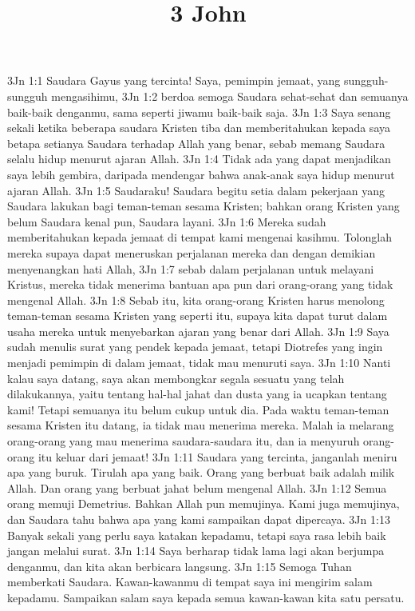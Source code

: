 

\title{3 John}

3Jn 1:1  Saudara Gayus yang tercinta! Saya, pemimpin jemaat, yang sungguh-sungguh mengasihimu,
3Jn 1:2  berdoa semoga Saudara sehat-sehat dan semuanya baik-baik denganmu, sama seperti jiwamu baik-baik saja.
3Jn 1:3  Saya senang sekali ketika beberapa saudara Kristen tiba dan memberitahukan kepada saya betapa setianya Saudara terhadap Allah yang benar, sebab memang Saudara selalu hidup menurut ajaran Allah.
3Jn 1:4  Tidak ada yang dapat menjadikan saya lebih gembira, daripada mendengar bahwa anak-anak saya hidup menurut ajaran Allah.
3Jn 1:5  Saudaraku! Saudara begitu setia dalam pekerjaan yang Saudara lakukan bagi teman-teman sesama Kristen; bahkan orang Kristen yang belum Saudara kenal pun, Saudara layani.
3Jn 1:6  Mereka sudah memberitahukan kepada jemaat di tempat kami mengenai kasihmu. Tolonglah mereka supaya dapat meneruskan perjalanan mereka dan dengan demikian menyenangkan hati Allah,
3Jn 1:7  sebab dalam perjalanan untuk melayani Kristus, mereka tidak menerima bantuan apa pun dari orang-orang yang tidak mengenal Allah.
3Jn 1:8  Sebab itu, kita orang-orang Kristen harus menolong teman-teman sesama Kristen yang seperti itu, supaya kita dapat turut dalam usaha mereka untuk menyebarkan ajaran yang benar dari Allah.
3Jn 1:9  Saya sudah menulis surat yang pendek kepada jemaat, tetapi Diotrefes yang ingin menjadi pemimpin di dalam jemaat, tidak mau menuruti saya.
3Jn 1:10  Nanti kalau saya datang, saya akan membongkar segala sesuatu yang telah dilakukannya, yaitu tentang hal-hal jahat dan dusta yang ia ucapkan tentang kami! Tetapi semuanya itu belum cukup untuk dia. Pada waktu teman-teman sesama Kristen itu datang, ia tidak mau menerima mereka. Malah ia melarang orang-orang yang mau menerima saudara-saudara itu, dan ia menyuruh orang-orang itu keluar dari jemaat!
3Jn 1:11  Saudara yang tercinta, janganlah meniru apa yang buruk. Tirulah apa yang baik. Orang yang berbuat baik adalah milik Allah. Dan orang yang berbuat jahat belum mengenal Allah.
3Jn 1:12  Semua orang memuji Demetrius. Bahkan Allah pun memujinya. Kami juga memujinya, dan Saudara tahu bahwa apa yang kami sampaikan dapat dipercaya.
3Jn 1:13  Banyak sekali yang perlu saya katakan kepadamu, tetapi saya rasa lebih baik jangan melalui surat.
3Jn 1:14  Saya berharap tidak lama lagi akan berjumpa denganmu, dan kita akan berbicara langsung.
3Jn 1:15  Semoga Tuhan memberkati Saudara. Kawan-kawanmu di tempat saya ini mengirim salam kepadamu. Sampaikan salam saya kepada semua kawan-kawan kita satu persatu.



